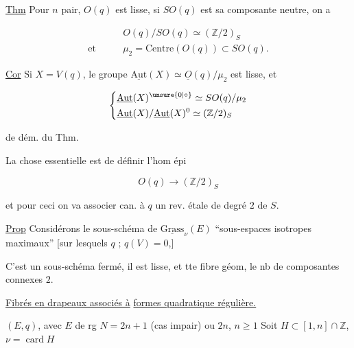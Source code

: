 
\uline{Thm} Pour $n$ pair, $O(q)$ est lisse, si $SO(q)$ est sa composante neutre, on a

\[
 \begin{aligned}
 &O(q)/SO(q)\simeq(\mathbb Z/2)_S\\
 \text{et}\qquad &\mu_2=\mathrm{Centre}(O(q))\subset SO(q).
 \end{aligned}
\]

\uline{Cor} Si $X=V(q)$, le groupe $\underline{\mathrm{Aut}}(X)\simeq\underline O(q)/\mu_2$ est lisse, et

\[
 \left\{\begin{aligned}
 &\underline{\mathrm{Aut}}(X)^{\unsure{0|\circ}}\simeq SO(q)/\mu_2\\
 &\underline{\mathrm{Aut}}(X)/\underline{\mathrm{Aut}}(X)^0\simeq(\mathbb Z/2)_S
 \end{aligned}\right.
\]

 de dém. du Thm.

La chose essentielle est de définir l'hom  épi

\[
 O(q)\longrightarrow(\mathbb Z/2)_S
\]

et pour ceci on va associer can. à $q$ un rev. étale de degré $2$ de $S$.


\uline{Prop} Considérons le sous-schéma de $\underline{\mathrm{Grass}}_\nu(E)$  ``sous-espaces isotropes maximaux'' [sur lesquels $q$    ; $q(V)=0$,] 

C'est un sous-schéma fermé, il est lisse, et  tte fibre géom, le nb de composantes connexes  $2$.


\uline{Fibrés en drapeaux associés à} \uline{formes quadratique régulière.}

$(E,q)$, avec $E$ de rg $N=2n+1$ (cas impair) ou $2n$, $n\geq1$  Soit $H\subset[1,n]\cap\mathbb Z$,   $\nu=\operatorname{card}H$

